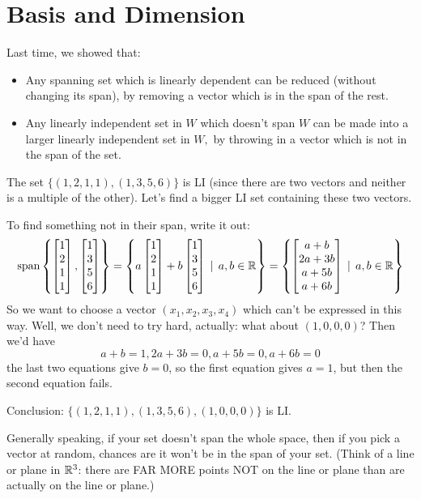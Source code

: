 \chapter{Basis and Dimension}\label{Chapter:09dimension}

Last time, we showed that:
\begin{itemize}
\item Any spanning set which is linearly dependent can be reduced (without changing its span), by removing a vector which is in the span of the rest.
\item Any linearly independent set in $W$  which doesn't span $W$ can be made into a larger linearly independent set in $W,$ by throwing in a vector which
is not in the span of the set.
\end{itemize}

\begin{myexample} The set $\{(1,2,1,1), (1,3,5,6)\}$ is LI (since there
are two vectors and neither is a multiple of the other).  Let's 
find a bigger LI set containing these two vectors.

To
find something not in their span, write it out:
$$
\textrm{span}\left\{ \left[ \begin{matrix} 1\\2\\1\\1 \end{matrix} \right], \left[ \begin{matrix} 1\\3\\5\\6 \end{matrix} \right] \right\} =
\left\{ a \left[ \begin{matrix} 1\\2\\1\\1 \end{matrix} \right]+b \left[ \begin{matrix} 1\\3\\5\\6 \end{matrix} \right] \,\mid \, a,b \in \mathbb{R}\right\} 
= 
\left\{ \left[ \begin{matrix} a+b\\2a+3b\\a+5b\\a+6b \end{matrix} \right] \,\mid \, a,b \in \mathbb{R}\right\}
$$
So we want to choose a vector $(x_1,x_2,x_3,x_4)$ which
can't be expressed in this way.  Well, we don't
need to try hard, actually:  what about $(1,0,0,0)$?
Then we'd have
$$
a+b=1, 2a+3b=0, a+5b=0, a+6b=0
$$
the last two equations give $b=0$, so the first equation gives $a=1$,
but then the second equation fails.  

Conclusion:  $\{(1,2,1,1), (1,3,5,6), (1,0,0,0)\}$ is LI.
\end{myexample}

\begin{remark}  Generally speaking, if your set doesn't span the whole space,
then if you pick a vector at random, chances are it won't be
in the span of your set.  (Think of a line or plane in $\mathbb{R}^3$:
there are FAR MORE points NOT on the line or plane than are
actually on the line or plane.)
\end{remark}

